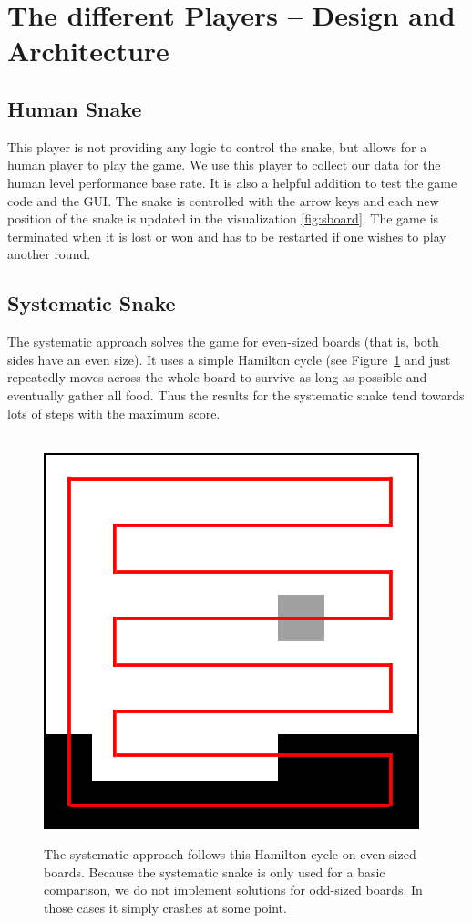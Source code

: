 \documentclass[a4paper]{article}
\begin{document}
\section{The different Players -- Design and Architecture}


\subsection{Human Snake}
This player is not providing any logic to control the snake, but allows for a human player to play the game. We use this player to collect our data for the human level performance base rate. It is also a helpful addition to test the game code and the GUI. The snake is controlled with the arrow keys and each new position of the snake is updated in the visualization \ref{fig:sboard}. The game is terminated when it is lost or won and has to be restarted if one wishes to play another round.


\subsection{Systematic Snake}
The systematic approach solves the game for even-sized boards (that is, both sides have an even size). It uses a simple Hamilton cycle (see Figure~\ref{fig:hamiltoncycle} and just repeatedly moves across the whole board to survive as long as possible and eventually gather all food. Thus the results for the systematic snake tend towards lots of steps with the maximum score.

\begin{figure}
	\centering
    \includegraphics[width=.5\textwidth]{hamiltoncycle.jpg}
    \caption{\label{fig:hamiltoncycle}The systematic approach follows this Hamilton cycle on even-sized boards. Because the systematic snake is only used for a basic comparison, we do not implement solutions for odd-sized boards. In those cases it simply crashes at some point.}
\end{figure}
\end{document}
